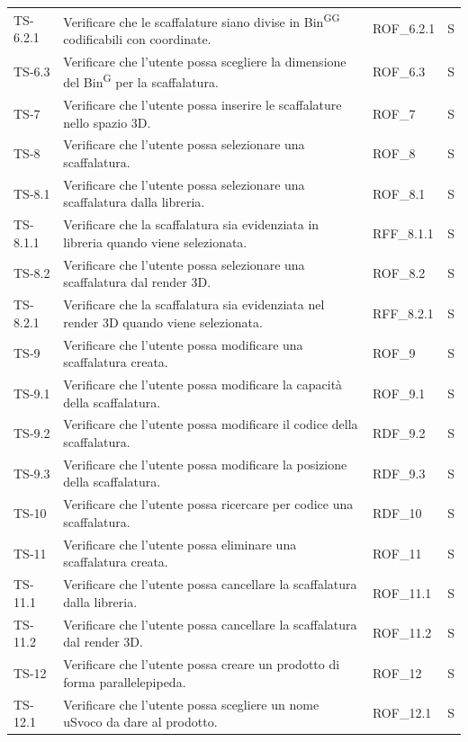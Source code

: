 \begin{xltabular}{0.9\textwidth}{X | p{0.5\textwidth} | X | X}
    TS-6.2.1& Verificare che le scaffalature siano divise in Bin\textsuperscript{G}\textsuperscript{G} codificabili con coordinate. & ROF\_6.2.1& S\\
    TS-6.3 & Verificare che l'utente possa scegliere la dimensione del Bin\textsuperscript{G} per la scaffalatura. & ROF\_6.3& S\\
    TS-7 & Verificare che l'utente possa inserire le scaffalature nello spazio 3D. & ROF\_7& S\\
    TS-8 & Verificare che l'utente possa selezionare una scaffalatura. & ROF\_8& S \\
    TS-8.1 & Verificare che l'utente possa selezionare una scaffalatura dalla libreria. & ROF\_8.1& S\\
    TS-8.1.1 &  Verificare che la scaffalatura sia evidenziata in libreria quando viene selezionata. & RFF\_8.1.1& S\\
    TS-8.2 & Verificare che l'utente possa selezionare una scaffalatura dal render 3D. & ROF\_8.2& S\\
    TS-8.2.1 & Verificare che la scaffalatura sia evidenziata nel render 3D quando viene selezionata. & RFF\_8.2.1& S\\
    TS-9 & Verificare che l'utente possa modificare una scaffalatura creata. & ROF\_9& S\\
    TS-9.1 & Verificare che l'utente possa modificare la capacità della scaffalatura. & ROF\_9.1& S\\
    TS-9.2 & Verificare che l'utente possa modificare il codice della scaffalatura. & RDF\_9.2& S \\
    TS-9.3 & Verificare che l'utente possa modificare la posizione della scaffalatura. & RDF\_9.3 & S \\
    TS-10 & Verificare che l'utente possa ricercare per codice una scaffalatura. & RDF\_10& S\\
    TS-11 & Verificare che l'utente possa eliminare una scaffalatura creata. &  ROF\_11& S\\
    TS-11.1 & Verificare che l'utente possa cancellare la scaffalatura dalla libreria.& ROF\_11.1 & S\\
    TS-11.2& Verificare che l'utente possa cancellare la scaffalatura dal render 3D. & ROF\_11.2& S\\
    TS-12 & Verificare che l'utente possa creare un prodotto di forma parallelepipeda. & ROF\_12& S \\
    TS-12.1& Verificare che l'utente possa scegliere un nome uSvoco da dare al prodotto. & ROF\_12.1& S \\

\end{xltabular}
